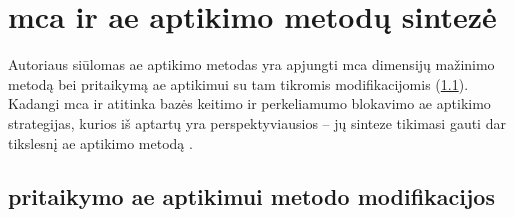 \section{\gls{mca} ir \LIME \gls{ae} aptikimo metodų sintezė}\label{sec:method}

Autoriaus siūlomas \gls{ae} aptikimo metodas yra apjungti \gls{mca} dimensijų
mažinimo metodą bei \LIME pritaikymą \gls{ae} aptikimui su tam tikromis
modifikacijomis (\ref{sec:method:mods}). Kadangi \gls{mca} ir \LIME atitinka
bazės keitimo  ir perkeliamumo
blokavimo  \gls{ae} aptikimo
strategijas, kurios iš aptartų yra perspektyviausios -- jų sinteze tikimasi
gauti dar tikslesnį \gls{ae} aptikimo metodą .

\subsection{\LIME pritaikymo \gls{ae} aptikimui metodo modifikacijos}\label{sec:method:mods}

